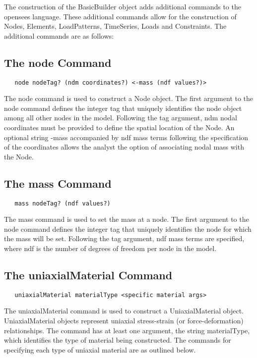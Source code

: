 \documentclass[12pt]{article}
\begin{document}
The construction of the BasicBuilder object adds additional commands
to the opensees language. These additional commands allow for the
construction of Nodes, Elements, LoadPatterns, TimeSeries, Loads and
Constraints. The additional commands are as follows:

\subsection{The node Command}
{\sf\small
\begin{verbatim}
   node nodeTag? (ndm coordinates?) <-mass (ndf values?)>
\end{verbatim}
}

The node command is used to construct a Node object. The first
argument to the node command defines the integer tag that uniquely
identifies the node object among all other nodes in the model. Following the tag
argument, ndm nodal coordinates must be provided to define the spatial
location of the Node. An optional string -mass accompanied by ndf
mass terms following the specification of the coordinates allows the
analyst the option of associating nodal mass with the Node.

\subsection{The mass Command}
{\sf\small
\begin{verbatim}
   mass nodeTag? (ndf values?)
\end{verbatim}
}

The mass command is used to set the mass at a node. The first
argument to the node command defines the integer tag that uniquely
identifies the node for which the mass will be set. Following the tag
argument, ndf mass terms are specified, where ndf is the number of
degrees of freedom per node in the model.

\subsection{The uniaxialMaterial Command}
{\sf\small
\begin{verbatim}
   uniaxialMaterial materialType <specific material args>
\end{verbatim}
}

The uniaxialMaterial command is used to construct a UniaxialMaterial object. 
UniaxialMaterial objects represent uniaxial stress-strain (or force-deformation)
relationships. The command has at least one argument, the string materialType, which
identifies the type of material being constructed. The commands for specifying each
type of uniaxial material are as outlined below.
\end{document}
